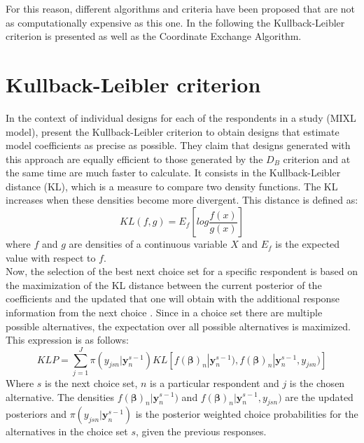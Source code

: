 \documentclass[12pt,a4paper,oneside]{article}
\begin{document}
\noindent For this reason, different algorithms and criteria have been proposed that are not as computationally expensive as this one. In the following the Kullback-Leibler criterion is presented as well as the Coordinate Exchange Algorithm.

\section{Kullback-Leibler criterion}
In the context of individual designs for each of the respondents in a study (MIXL model), \citet{Crabbe2014} present the Kullback-Leibler criterion to obtain designs that estimate model coefficients as precise as possible. They claim that designs generated with this approach are equally efficient to those generated by the $D_B$ criterion and at the same time are much faster to calculate. It consists in the Kullback-Leibler distance (KL), which is a measure to compare two density functions. The KL increases when these densities become more divergent. This distance is defined as:
\begin{equation}
    KL(f,g) = E_f \left[log \frac{f(x)}{g(x)}\right]
\end{equation}
where $f$ and $g$ are densities of a continuous variable $X$ and $E_f$ is the expected value with respect to $f$. \\

\noindent Now, the selection of the best next choice set for a specific respondent is based on the maximization of the KL distance between the current posterior of the coefficients and the updated that one will obtain with the additional response information from the next choice \citep{Crabbe2014}. Since in a choice set there are multiple possible alternatives, the expectation over all possible alternatives is maximized. This expression is as follows:
\begin{equation}
    KLP = \sum_{j=1}^J \pi (y_{jsn}|\mathbf{y}_n^{s-1}) KL\left[f(\pmb{\beta})_n|\mathbf{y}_n^{s-1}), f(\pmb{\beta})_n|\mathbf{y}_n^{s-1},y_{jsn})\right]
\end{equation}
Where $s$ is the next choice set, $n$ is a particular respondent and $j$ is the chosen alternative. The densities $f(\pmb{\beta})_n|\mathbf{y}_n^{s-1})$ and $f(\pmb{\beta})_n|\mathbf{y}_n^{s-1},y_{jsn})$ are the updated posteriors and $\pi (y_{jsn}|\mathbf{y}_n^{s-1})$ is the posterior weighted choice probabilities for the alternatives in the choice set $s$, given the previous responses.\\
\end{document}
